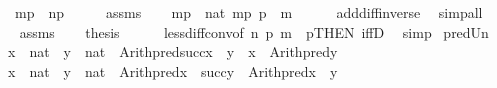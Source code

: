 \begin{isabellebody}
\ \ \ {\isachardoublequoteopen}m{\isacharhash}{\kern0pt}{\isacharminus}{\kern0pt}p\ {\isacharless}{\kern0pt}\ n{\isacharhash}{\kern0pt}{\isacharminus}{\kern0pt}p{\isachardoublequoteclose}\isanewline
%
\isadelimproof
%
\endisadelimproof
%
\isatagproof
{}\isamarkupfalse%
\ {\isacharminus}{\kern0pt}\isanewline
\ \ \isamarkupfalse%
\ assms\isanewline
\ \ \isamarkupfalse%
\ {\isachardoublequoteopen}m{\isacharhash}{\kern0pt}{\isacharminus}{\kern0pt}p\ {\isasymin}\ nat{\isachardoublequoteclose}\ {\isachardoublequoteopen}m{\isacharhash}{\kern0pt}{\isacharminus}{\kern0pt}p\ {\isacharhash}{\kern0pt}{\isacharplus}{\kern0pt}p\ {\isacharequal}{\kern0pt}\ m{\isachardoublequoteclose}\isanewline
\ \ \ \ \isamarkupfalse%
\ add{\isacharunderscore}{\kern0pt}diff{\isacharunderscore}{\kern0pt}inverse{}\ \isamarkupfalse%
\ simp{\isacharunderscore}{\kern0pt}all\isanewline
\ \ \isamarkupfalse%
\ assms\isanewline
\ \ \isamarkupfalse%
\ {\isacharquery}{\kern0pt}thesis\isanewline
\ \ \ \ \isamarkupfalse%
\ less{\isacharunderscore}{\kern0pt}diff{\isacharunderscore}{\kern0pt}conv{\isacharbrackleft}{\kern0pt}of\ n\ p\ {\isachardoublequoteopen}m\ {\isacharhash}{\kern0pt}{\isacharminus}{\kern0pt}\ p{\isachardoublequoteclose}{\isacharcomma}{\kern0pt}THEN\ iffD{}{\isacharbrackright}{\kern0pt}\ \isamarkupfalse%
\ simp\isanewline
{}\isamarkupfalse%
%
\endisatagproof
{\isafoldproof}%
%
\isadelimproof
\isanewline
%
\endisadelimproof
\isanewline
{}\isamarkupfalse%
\ pred{\isacharunderscore}{\kern0pt}Un{\isacharcolon}{\kern0pt}\isanewline
\ \ {\isachardoublequoteopen}x\ {\isasymin}\ nat\ {\isasymLongrightarrow}\ y\ {\isasymin}\ nat\ {\isasymLongrightarrow}\ Arith{\isachardot}{\kern0pt}pred{\isacharparenleft}{\kern0pt}succ{\isacharparenleft}{\kern0pt}x{\isacharparenright}{\kern0pt}\ {\isasymunion}\ y{\isacharparenright}{\kern0pt}\ {\isacharequal}{\kern0pt}\ x\ {\isasymunion}\ Arith{\isachardot}{\kern0pt}pred{\isacharparenleft}{\kern0pt}y{\isacharparenright}{\kern0pt}{\isachardoublequoteclose}\isanewline
\ \ {\isachardoublequoteopen}x\ {\isasymin}\ nat\ {\isasymLongrightarrow}\ y\ {\isasymin}\ nat\ {\isasymLongrightarrow}\ Arith{\isachardot}{\kern0pt}pred{\isacharparenleft}{\kern0pt}x\ {\isasymunion}\ succ{\isacharparenleft}{\kern0pt}y{\isacharparenright}{\kern0pt}{\isacharparenright}{\kern0pt}\ {\isacharequal}{\kern0pt}\ Arith{\isachardot}{\kern0pt}pred{\isacharparenleft}{\kern0pt}x{\isacharparenright}{\kern0pt}\ {\isasymunion}\ y{\isachardoublequoteclose}\isanewline

\end{isabellebody}
